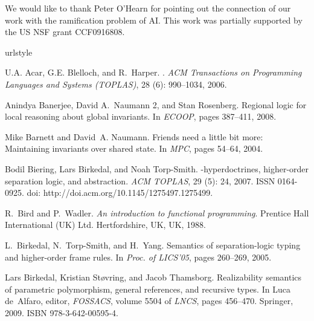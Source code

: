 \documentclass[natbib]{sigplanconf}
\begin{document}
\acks We would like to thank Peter O'Hearn for pointing out the connection
of our work with the ramification problem of AI. This work was
partially supported by the US NSF grant CCF0916808.



\begin{thebibliography}{26}
\providecommand{\natexlab}[1]{#1}
\providecommand{\url}[1]{\texttt{#1}}
\expandafter\ifx\csname urlstyle\endcsname\relax
  \providecommand{\doi}[1]{doi: #1}\else
  \providecommand{\doi}{doi: \begingroup \urlstyle{rm}\Url}\fi

U.A. Acar, G.E. Blelloch, and R.~Harper.
.
\newblock \emph{ACM Transactions on Programming Languages and Systems
  (TOPLAS)}, 28 (6): 990--1034, 2006.

Anindya Banerjee, David A.~Naumann 2, and Stan Rosenberg.
\newblock Regional logic for local reasoning about global invariants.
\newblock In \emph{ECOOP}, pages 387--411, 2008.

Mike Barnett and David~A. Naumann.
\newblock Friends need a little bit more: Maintaining invariants over shared
  state.
\newblock In \emph{MPC}, pages 54--64, 2004.

Bodil Biering, Lars Birkedal, and Noah Torp-Smith.
-hyperdoctrines, higher-order separation logic, and abstraction.
\newblock \emph{ACM TOPLAS}, 29 (5): 24, 2007.
\newblock ISSN 0164-0925.
\newblock \doi{http://doi.acm.org/10.1145/1275497.1275499}.

R.~Bird and P.~Wadler.
\newblock \emph{{An introduction to functional programming}}.
\newblock Prentice Hall International (UK) Ltd. Hertfordshire, UK, UK, 1988.

L.~Birkedal, N.~Torp-Smith, and H.~Yang.
\newblock Semantics of separation-logic typing and higher-order frame rules.
\newblock In \emph{Proc. of LICS'05}, pages 260--269, 2005.

Lars Birkedal, Kristian St{\o}vring, and Jacob Thamsborg.
\newblock Realizability semantics of parametric polymorphism, general
  references, and recursive types.
\newblock In Luca de~Alfaro, editor, \emph{FOSSACS}, volume 5504 of
  \emph{LNCS}, pages 456--470. Springer, 2009.
\newblock ISBN 978-3-642-00595-4.


\end{thebibliography}
\end{document}
